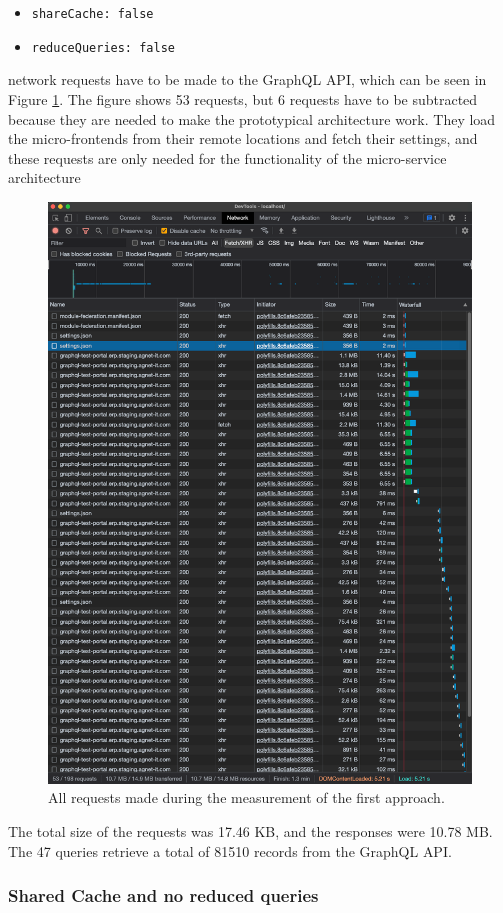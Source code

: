\begin{itemize}
  \item \texttt{shareCache: false}
  \item \texttt{reduceQueries: false}
\end{itemize}

 network requests have to be made to the GraphQL \ac{API}, which can be seen in Figure \ref{fig:results:no-shared-cache-no-reduction}. The figure shows 53 requests, but 6 requests have to be subtracted because they are needed to make the prototypical architecture work. They load the micro-frontends from their remote locations and fetch their settings, and these requests are only needed for the functionality of the micro-service architecture

\ifshowImages
\begin{figure}[H]
\centering
\includegraphics[width=0.7\linewidth]{images/results/1-attempt/no-shared-cache-no-reduction.png}
\caption{All requests made during the measurement of the first approach.}\label{fig:results:no-shared-cache-no-reduction}
\end{figure}
\fi

\noindent The total size of the requests was 17.46 KB, and the responses were 10.78 MB. The 47 queries retrieve a total of 81510 records from the GraphQL  \ac{API}.

\subsubsection{Shared Cache and no reduced queries}\label{subsubsection:results:performance-measurement:shared-cache-no-reduction}


